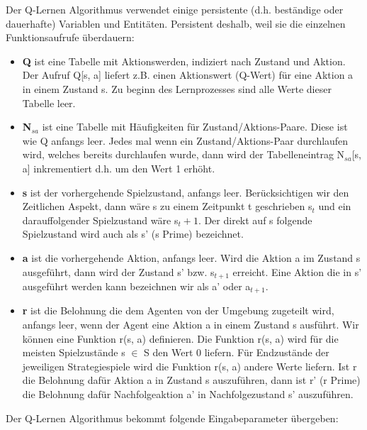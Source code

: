 Der Q-Lernen Algorithmus verwendet einige persistente (d.h. beständige oder dauerhafte) Variablen und Entitäten. Persistent deshalb, weil sie die einzelnen Funktionsaufrufe überdauern: 
\begin{itemize}

\item \textbf{Q} ist eine Tabelle mit Aktionswerden, indiziert nach Zustand und Aktion. Der Aufruf Q[s, a] liefert z.B. einen Aktionswert (Q-Wert) für eine Aktion a in einem Zustand s. Zu beginn des Lernprozesses sind alle Werte dieser Tabelle leer.

\item \textbf{N$_{sa}$} ist eine Tabelle mit Häufigkeiten für Zustand/Aktions-Paare.  Diese ist wie Q anfangs leer. Jedes mal wenn ein Zustand/Aktions-Paar durchlaufen wird, welches bereits durchlaufen wurde, dann wird der Tabelleneintrag N$_{sa}$[s, a] inkrementiert d.h. um den Wert 1 erhöht.

\item \textbf{s} ist der vorhergehende Spielzustand, anfangs leer. Berücksichtigen wir den Zeitlichen Aspekt, dann wäre s zu einem Zeitpunkt t geschrieben s${_t}$ und ein darauffolgender Spielzustand wäre s${_t+1}$. Der direkt auf s folgende Spielzustand wird auch als s' (s Prime) bezeichnet.

\item \textbf{a} ist die vorhergehende Aktion, anfangs leer. Wird die Aktion a im Zustand s ausgeführt, dann wird der Zustand s' bzw. s$_{t+1}$ erreicht. Eine Aktion die in s' ausgeführt werden kann bezeichnen wir als a' oder a$_{t+1}$.

\item \textbf{r} ist die Belohnung die dem Agenten von der Umgebung zugeteilt wird, anfangs leer, wenn der Agent eine Aktion a in einem Zustand s ausführt. Wir können eine Funktion r(s, a) definieren. Die Funktion r(s, a) wird für die meisten Spielzustände s $\in$ S den Wert 0 liefern. Für Endzustände der jeweiligen Strategiespiele wird die Funktion r(s, a) andere Werte liefern. Ist r die Belohnung dafür Aktion a in Zustand s auszuführen, dann ist r' (r Prime) die Belohnung dafür Nachfolgeaktion a' in Nachfolgezustand s' auszuführen.
\end{itemize}

Der Q-Lernen Algorithmus bekommt folgende Eingabeparameter übergeben:

